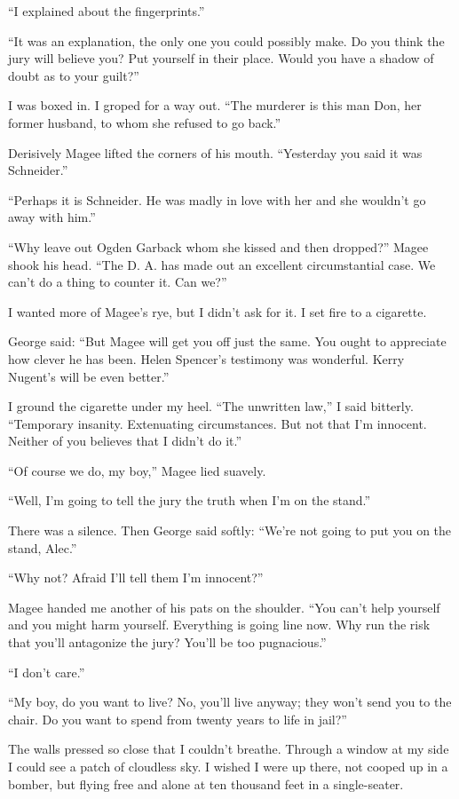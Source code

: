 {“I explained about the fingerprints.”

“It was an explanation, the only one you could possibly make. Do you think the jury will believe you? Put yourself in their place. Would you have a shadow of doubt as to your guilt?”

I was boxed in. I groped for a way out. “The murderer is this man Don, her former husband, to whom she refused to go back.”

Derisively Magee lifted the corners of his mouth. “Yesterday you said it was Schneider.”

“Perhaps it is Schneider. He was madly in love with her and she wouldn’t go away with him.”

“Why leave out Ogden Garback whom she kissed and then dropped?” Magee shook his head. “The D. A. has made out an excellent circumstantial case. We can’t do a thing to counter it. Can we?”

I wanted more of Magee’s rye, but I didn’t ask for it. I set fire to a cigarette.

George said: “But Magee will get you off just the same. You ought to appreciate how clever he has been. Helen Spencer’s testimony was wonderful. Kerry Nugent’s will be even better.”

I ground the cigarette under my heel. “The unwritten law,” I said bitterly. “Temporary insanity. Extenuating circumstances. But not that I’m innocent. Neither of you believes that I didn’t do it.”

“Of course we do, my boy,” Magee lied suavely.

“Well, I’m going to tell the jury the truth when I’m on the stand.”

There was a silence. Then George said softly: “We’re not going to put you on the stand, Alec.”

“Why not? Afraid I’ll tell them I’m innocent?”

Magee handed me another of his pats on the shoulder. “You can’t help yourself and you might harm yourself. Everything is going line now. Why run the risk that you’ll antagonize the jury? You’ll be too pugnacious.”

“I don’t care.”

“My boy, do you want to live? No, you’ll live anyway; they won’t send you to the chair. Do you want to spend from twenty years to life in jail?”

The walls pressed so close that I couldn’t breathe. Through a window at my side I could see a patch of cloudless sky. I wished I were up there, not cooped up in a bomber, but flying free and alone at ten thousand feet in a single-seater.

}
